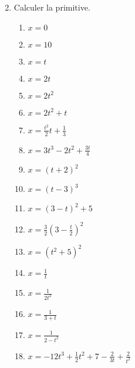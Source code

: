 \documentclass[12pt,a4paper,fleqn]{article}
\begin{document}
\begin{enumerate}
\begin{multicols}{3}
\begin{enumerate}[i]
    \end{enumerate}
\end{multicols}
\item Calculer la primitive. 
\begin{multicols}{3}
    \begin{enumerate}[i]
        \item $x = 0$
        \item $x = 10$
        \item $x = t$
        \item $x = 2t$
        \item $x = 2t^2$
        \item $x = 2t^2 + t$
        \item $x = \frac{t^2}{2}t + \frac{1}{3}$
        \item $x = 3t^3 - 2t^2 + \frac{3t}{4}$
        \item $x = (t+2)^2$
        \item $x = (t-3)^3$
        \item $x = (3-t)^2 + 5$
        \item $x = \frac{3}{2}(3 - \frac{t}{2})^2$
        \item $x = (t^2 + 5)^2$
        \item $x = \frac{1}{t}$
        \item $x = \frac{1}{2t^2}$
        \item $x = \frac{1}{3+t}$
        \item $x = \frac{1}{2-t^2}$
        \item $x = -12t^3 + \frac{1}{2}t^2 + 7 - \frac{2}{3t} + \frac{2}{t^2}  $
    \end{enumerate}
\end{multicols}
\end{enumerate}
\end{document}

